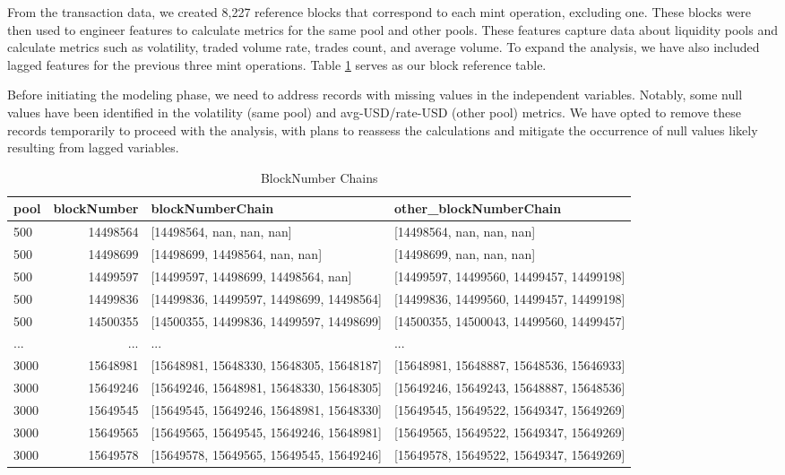 \documentclass{article}
\begin{document}
{From the transaction data, we created 8,227 reference blocks that correspond to each mint operation, excluding one. These blocks were then used to engineer features to calculate metrics for the same pool and other pools. These features capture data about liquidity pools and calculate metrics such as volatility, traded volume rate, trades count, and average volume. To expand the analysis, we have also included lagged features for the previous three mint operations. Table \ref{tab:chains} serves as our block reference table.

Before initiating the modeling phase, we need to address records with missing values in the independent variables. Notably, some null values have been identified in the volatility (same pool) and avg-USD/rate-USD (other pool) metrics. We have opted to remove these records temporarily to proceed with the analysis, with plans to reassess the calculations and mitigate the occurrence of null values likely resulting from lagged variables.

\begin{table}[htbp]
  \centering
  \small
  \begin{tabularx}{\linewidth}{|X|r|l|l|}
    \hline
    \textbf{pool} & \textbf{blockNumber} & \textbf{blockNumberChain} & \textbf{other\_blockNumberChain} \\
    \hline
    500 & 14498564 & [14498564, nan, nan, nan] & [14498564, nan, nan, nan] \\
    500 & 14498699 & [14498699, 14498564, nan, nan] & [14498699, nan, nan, nan] \\
    500 & 14499597 & [14499597, 14498699, 14498564, nan] & [14499597, 14499560, 14499457, 14499198] \\
    500 & 14499836 & [14499836, 14499597, 14498699, 14498564] & [14499836, 14499560, 14499457, 14499198] \\
    500 & 14500355 & [14500355, 14499836, 14499597, 14498699] & [14500355, 14500043, 14499560, 14499457] \\
    ... & ... & ... & ... \\
    3000 & 15648981 & [15648981, 15648330, 15648305, 15648187] & [15648981, 15648887, 15648536, 15646933] \\
    3000 & 15649246 & [15649246, 15648981, 15648330, 15648305] & [15649246, 15649243, 15648887, 15648536] \\
    3000 & 15649545 & [15649545, 15649246, 15648981, 15648330] & [15649545, 15649522, 15649347, 15649269] \\
    3000 & 15649565 & [15649565, 15649545, 15649246, 15648981] & [15649565, 15649522, 15649347, 15649269] \\
    3000 & 15649578 & [15649578, 15649565, 15649545, 15649246] & [15649578, 15649522, 15649347, 15649269] \\
    \hline
  \end{tabularx}
  \caption{BlockNumber Chains}
  \label{tab:chains}
\end{table}

}
\end{document}
